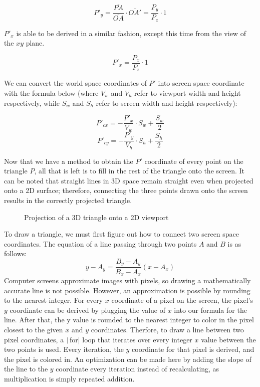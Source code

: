 \documentclass[a4paper]{article}
\begin{document}
\[
    P'_{y} = \frac{\overline{PA}}{\overline{OA}} \cdot \overline{OA'} = \frac{P_{y}}{P_{z}} \cdot 1
\]

$P'_{x}$ is able to be derived in a similar fashion, except this time from the view of the $xy$ plane.

\[
    P'_{x} = \frac{P_{x}}{P_{z}} \cdot 1
\]

We can convert the world space coordinates of $P'$ into screen space coordinate with the formula below (where $V_{w}$ and $V_{h}$ refer to viewport width and height respectively, while $S_{w}$ and $S_{h}$ refer to screen width and height respectively):

\[
    P'_{cx} = -\frac{P'_{x}}{V_{w}} \cdot S_{w} + \frac{S_{w}}{2}
\]
\[
    P'_{cy} = -\frac{P'_{y}}{V_{h}} \cdot S_{h} + \frac{S_h}{2}
\]

Now that we have a method to obtain the $P'$ coordinate of every point on the triangle $P$, all that is left is to fill in the rest of the triangle onto the screen. It can be noted that straight lines in 3D space remain straight even when projected onto a 2D surface; therefore, connecting the three points drawn onto the screen results in the correctly projected triangle.

\begin{figure}[htp]
    \centering
    
    \caption{Projection of a 3D triangle onto a 2D viewport}
\end{figure}

To draw a triangle, we must first figure out how to connect two screen space coordinates. The equation of a line passing through two points $A$ and $B$ is as follows:
\[
    y - A_{y} = \frac{B_{y} - A_{y}}{B_{x} - A_{x}} (x - A_{x})
\]
Computer screens approximate images with pixels, so drawing a mathematically accurate line is not possible. However, an approximation is possible by rounding to the nearest integer. For every $x$ coordinate of a pixel on the screen, the pixel's $y$ coordinate can be derived by plugging the value of $x$ into our formula for the line. After that, the y value is rounded to the nearest integer to color in the pixel closest to the given $x$ and $y$ coordinates. Therfore, to draw a line between two pixel coordinates, a \texttt|for| loop that iterates over every integer $x$ value between the two points is used. Every iteration, the $y$ coordinate for that pixel is derived, and the pixel is colored in. An optimization can be made here by adding the slope of the line to the $y$ coordinate every iteration instead of recalculating, as multiplication is simply repeated addition.
\end{document}

